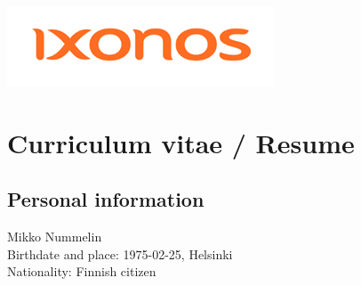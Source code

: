\documentclass[a4paper,12pt]{article}
\begin{document}
\includegraphics{Ixonos_300pix_RGB}
\section*{Curriculum vitae / Resume}

\subsection*{Personal information}
Mikko Nummelin \\
Birthdate and place: 1975-02-25, Helsinki \\
Nationality: Finnish citizen
\end{document}
